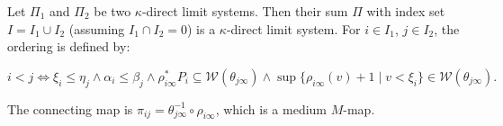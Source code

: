 Let $\Pi_1$ and $\Pi_2$ be two $\kappa$-direct limit systems. Then their sum $\Pi$ with index set $I = I_1 \cup I_2$ (assuming $I_1 \cap I_2 = 0$) is a $\kappa$-direct limit system. For $i \in I_1$, $j \in I_2$, the ordering is defined by:

$$i < j \iff \xi_i \leq \eta_j \wedge \alpha_i \leq \beta_j \wedge \rho_{i\infty}^* P_i \subseteq \mathcal{W}(\theta_{j\infty}) \wedge \sup\{\rho_{i\infty}(v) + 1 \mid v < \xi_i\} \in \mathcal{W}(\theta_{j\infty}).$$

The connecting map is $\pi_{ij} = \theta_{j\infty}^{-1} \circ \rho_{i\infty}$, which is a medium $M$-map.
